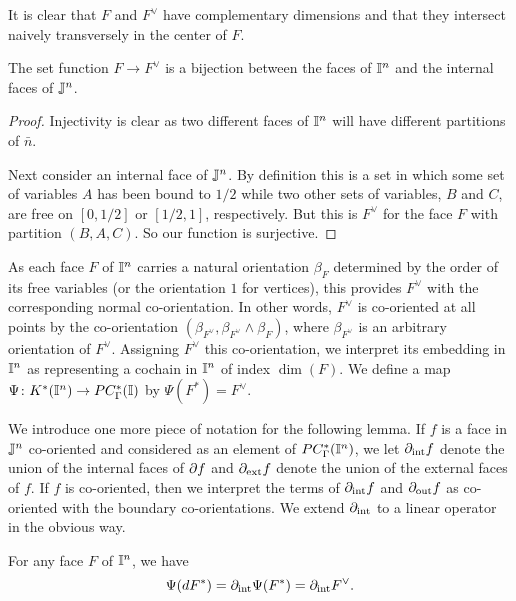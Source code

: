 It is clear that $F$ and $F^\vee$ have complementary dimensions and that they intersect naively transversely in the center of $F$.

\begin{lemma}
	The set function $F \to F^\vee$ is a bijection between the faces of $\mathbb{I}^n$ and the internal faces of $\mathbb{J}^n$.
\end{lemma}

\begin{proof}
	Injectivity is clear as two different faces of $\mathbb{I}^n$ will have different partitions of $\bar n$.

	Next consider an internal face of $\mathbb{J}^n$.
	By definition this is a set in which some set of variables $A$ has been bound to $1/2$ while two other sets of variables, $B$ and $C$, are free on $[0,1/2]$ or $[1/2,1]$, respectively.
	But this is $F^\vee$ for the face $F$ with partition $(B,A,C)$.
	So our function is surjective.
\end{proof}

As each face $F$ of $\mathbb{I}^n$ carries a natural orientation $\beta_F$ determined by the order of its free variables (or the orientation $1$ for vertices), this provides $F^\vee$ with the corresponding normal co-orientation.
In other words, $F^\vee$ is co-oriented at all points by the co-orientation $(\beta_{F^\vee}, \beta_{F^\vee} \wedge \beta_F)$, where $\beta_{F^\vee}$ is an arbitrary orientation of $F^\vee$.
Assigning $F^\vee$ this co-orientation, we interpret its embedding in $\mathbb{I}^n$ as representing a cochain in $\mathbb{I}^n$ of index $\dim(F)$.
We define a map $\Psi \colon K^*(\mathbb{I}^n) \to PC_\Gamma^*(\mathbb{I})$ by $\Psi(F^*) = F^\vee$.

We introduce one more piece of notation for the following lemma.
If $f$ is a face in $\mathbb{J}^n$ co-oriented and considered as an element of $PC^*_\Gamma(\mathbb{I}^n)$, we let $\partial_{\text{int}}f$ denote the union of the internal faces of $\partial f$ and $\partial_{\text{ext}}f$ denote the union of the external faces of $f$.
If $f$ is co-oriented, then we interpret the terms of $\partial_{\text{int}}f$ and $\partial_{\text{out}}f$ as co-oriented with the boundary co-orientations.
We extend $\partial_{\text{int}}$ to a linear operator in the obvious way.

\begin{lemma}\label{L: dualizing bijection}
	For any face $F$ of $\mathbb{I}^n$, we have $$\Psi(d F^*) = \partial_{\text{int}}\Psi(F^*) = \partial_{\text{int}}F^\vee.$$
\end{lemma}

